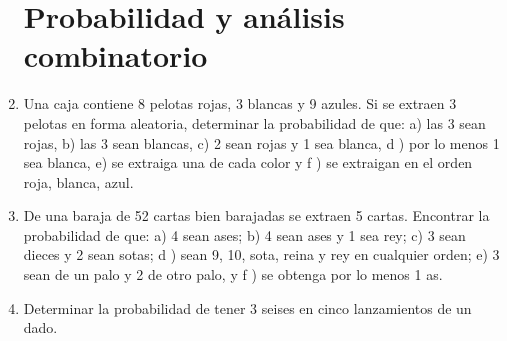 \documentclass[10pt,twoside]{article}
\begin{document}
\begin{enumerate}
\section*{Probabilidad y análisis combinatorio}
\item Una caja contiene 8 pelotas rojas, 3 blancas y 9 azules. Si se extraen 3 pelotas en forma aleatoria, determinar
la probabilidad de que: a) las 3 sean rojas, b) las 3 sean blancas, c) 2 sean rojas y 1 sea blanca, d ) por lo menos 1 sea blanca, e) se extraiga una de cada color y f ) se extraigan en el orden roja, blanca, azul.
\item De una baraja de 52 cartas bien barajadas se extraen 5 cartas. Encontrar la probabilidad de que: a) 4 sean ases; b) 4 sean ases y 1 sea rey; c) 3 sean dieces y 2 sean sotas; d ) sean 9, 10, sota, reina y rey en cualquier orden; e) 3 sean de un palo y 2 de otro palo, y f ) se obtenga por lo menos 1 as.
\item Determinar la probabilidad de tener 3 seises en cinco lanzamientos de un dado.
\end{enumerate}
\end{document}
